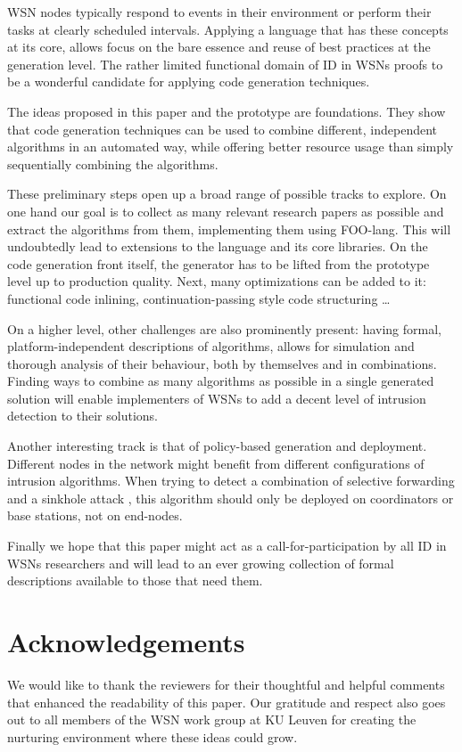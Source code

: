 \documentclass[conference]{IEEEtran}
\begin{document}
WSN nodes typically respond to events in their environment or perform their
tasks at clearly scheduled intervals. Applying a language that has these
concepts at its core, allows focus on the bare essence and reuse of best
practices at the generation level. The rather limited functional domain of ID
in WSNs proofs to be a wonderful candidate for applying code generation
techniques.

The ideas proposed in this paper and the prototype are foundations. They show
that code generation techniques can be used to combine different, independent
algorithms in an automated way, while offering better resource usage than
simply sequentially combining the algorithms.

These preliminary steps open up a broad range of possible tracks to explore. On
one hand our goal is to collect as many relevant research papers as possible
and extract the algorithms from them, implementing them using FOO-lang. This
will undoubtedly lead to extensions to the language and its core libraries. On
the code generation front itself, the generator has to be lifted from the
prototype level up to production quality. Next, many optimizations can be added
to it: functional code inlining, continuation-passing style code
structuring \dots

On a higher level, other challenges are also prominently present: having
formal, platform-independent descriptions of algorithms, allows for simulation
and thorough analysis of their behaviour, both by themselves and in
combinations. Finding ways to combine as many algorithms as possible in a
single generated solution will enable implementers of WSNs to add a decent
level of intrusion detection to their solutions.

Another interesting track is that of policy-based generation and deployment.
Different nodes in the network might benefit from different configurations of
intrusion algorithms. When trying to detect a combination of selective
forwarding and a sinkhole attack \cite{ngai2006intruder}, this algorithm should
only be deployed on coordinators or base stations, not on end-nodes.

Finally we hope that this paper might act as a call-for-participation by all
ID in WSNs researchers and will lead to an ever growing collection of formal
descriptions available to those that need them.

\section*{Acknowledgements}
\label{section:acknowledgements}

We would like to thank the reviewers for their thoughtful and helpful comments
that enhanced the readability of this paper. Our gratitude and respect also
goes out to all members of the WSN work group at KU Leuven for creating the
nurturing environment where these ideas could grow.



\end{document}
